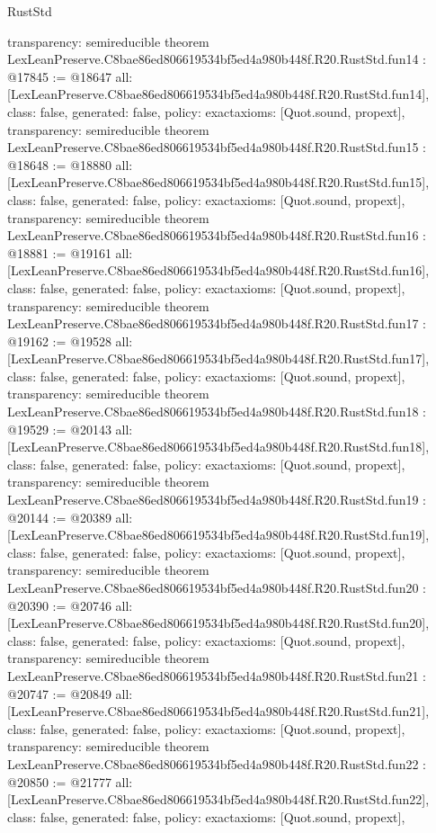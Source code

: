 \begin{lexlean}{RustStd}
\begin{coremodule}
{  transparency: semireducible
}
theorem LexLeanPreserve.C8bae86ed806619534bf5ed4a980b448f.R20.RustStd.fun14 : @17845 := @18647 {
  all: [LexLeanPreserve.C8bae86ed806619534bf5ed4a980b448f.R20.RustStd.fun14],
  class: false,
  generated: false,
  policy: exact{axioms: [Quot.sound, propext]},
  transparency: semireducible
}
theorem LexLeanPreserve.C8bae86ed806619534bf5ed4a980b448f.R20.RustStd.fun15 : @18648 := @18880 {
  all: [LexLeanPreserve.C8bae86ed806619534bf5ed4a980b448f.R20.RustStd.fun15],
  class: false,
  generated: false,
  policy: exact{axioms: [Quot.sound, propext]},
  transparency: semireducible
}
theorem LexLeanPreserve.C8bae86ed806619534bf5ed4a980b448f.R20.RustStd.fun16 : @18881 := @19161 {
  all: [LexLeanPreserve.C8bae86ed806619534bf5ed4a980b448f.R20.RustStd.fun16],
  class: false,
  generated: false,
  policy: exact{axioms: [Quot.sound, propext]},
  transparency: semireducible
}
theorem LexLeanPreserve.C8bae86ed806619534bf5ed4a980b448f.R20.RustStd.fun17 : @19162 := @19528 {
  all: [LexLeanPreserve.C8bae86ed806619534bf5ed4a980b448f.R20.RustStd.fun17],
  class: false,
  generated: false,
  policy: exact{axioms: [Quot.sound, propext]},
  transparency: semireducible
}
theorem LexLeanPreserve.C8bae86ed806619534bf5ed4a980b448f.R20.RustStd.fun18 : @19529 := @20143 {
  all: [LexLeanPreserve.C8bae86ed806619534bf5ed4a980b448f.R20.RustStd.fun18],
  class: false,
  generated: false,
  policy: exact{axioms: [Quot.sound, propext]},
  transparency: semireducible
}
theorem LexLeanPreserve.C8bae86ed806619534bf5ed4a980b448f.R20.RustStd.fun19 : @20144 := @20389 {
  all: [LexLeanPreserve.C8bae86ed806619534bf5ed4a980b448f.R20.RustStd.fun19],
  class: false,
  generated: false,
  policy: exact{axioms: [Quot.sound, propext]},
  transparency: semireducible
}
theorem LexLeanPreserve.C8bae86ed806619534bf5ed4a980b448f.R20.RustStd.fun20 : @20390 := @20746 {
  all: [LexLeanPreserve.C8bae86ed806619534bf5ed4a980b448f.R20.RustStd.fun20],
  class: false,
  generated: false,
  policy: exact{axioms: [Quot.sound, propext]},
  transparency: semireducible
}
theorem LexLeanPreserve.C8bae86ed806619534bf5ed4a980b448f.R20.RustStd.fun21 : @20747 := @20849 {
  all: [LexLeanPreserve.C8bae86ed806619534bf5ed4a980b448f.R20.RustStd.fun21],
  class: false,
  generated: false,
  policy: exact{axioms: [Quot.sound, propext]},
  transparency: semireducible
}
theorem LexLeanPreserve.C8bae86ed806619534bf5ed4a980b448f.R20.RustStd.fun22 : @20850 := @21777 {
  all: [LexLeanPreserve.C8bae86ed806619534bf5ed4a980b448f.R20.RustStd.fun22],
  class: false,
  generated: false,
  policy: exact{axioms: [Quot.sound, propext]},
}
\end{coremodule}
\end{lexlean}
